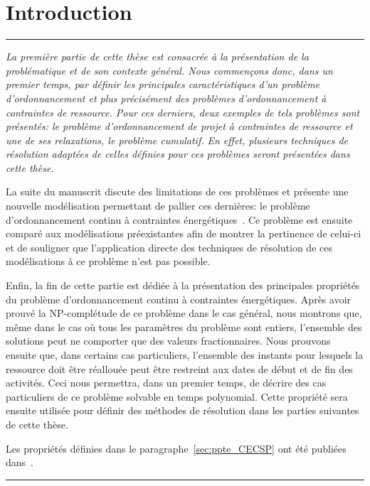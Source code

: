 \cleardoublepage
\begin{minipage}{0.95\linewidth}
  \part{Introduction}
  \vspace{15mm} %
  \parttoc 

\end{minipage}

\newpage
\thispagestyle{empty}
\begin{center}
  \begin{minipage}{\textwidth}
    \hrule
    \vspace{0.5cm}
    {\it  La première partie de cette thèse est consacrée à la présentation de
    la problématique et de son contexte général. Nous commençons donc,
    dans un premier temps, par définir les principales caractéristiques
    d'un problème d'ordonnancement et plus précisément des problèmes
    d'ordonnancement à contraintes de ressource. Pour ces derniers,
    deux exemples de tels problèmes sont présentés: le problème
    d'ordonnancement de projet à contraintes de ressource et une de ses relaxations, le
    problème cumulatif. En effet, plusieurs techniques de résolution
    adaptées de celles définies pour ces problèmes seront présentées
    dans cette thèse. 

    La suite du manuscrit discute des limitations de ces problèmes
    et présente une nouvelle modélisation permettant de pallier ces
    dernières: le problème d'ordonnancement continu à contraintes
    énergétiques~\cite{ArtiguesLopez,Nattaf_ORSpectrum,Nattaf_Constraints}. Ce
    problème est ensuite comparé aux modélisations préexistantes afin de
    montrer la pertinence de celui-ci et de souligner que l'application
    directe des techniques de résolution de ces modélisations à ce
    problème n'est pas possible.

    Enfin, la fin de cette partie est dédiée à la présentation des
    principales propriétés du problème d'ordonnancement continu à
    contraintes énergétiques. Après avoir prouvé la NP-complétude de ce
    problème dans le cas général, nous montrons que, même dans le cas où
    tous les paramètres du problème sont entiers, l'ensemble des solutions
    peut ne comporter que des valeurs fractionnaires. Nous prouvons
    ensuite que, dans certains cas particuliers, l'ensemble des instants
    pour lesquels la ressource doit être réallouée peut être
    restreint aux dates de début et de fin des activités. Ceci nous
    permettra, dans un premier temps, de décrire des cas particuliers
    de ce problème solvable en temps polynomial. Cette propriété sera
    ensuite utilisée pour définir des méthodes de résolution dans les
    parties suivantes de cette thèse. 

    Les propriétés définies dans le paragraphe~\ref{sec:ppte_CECSP}
    ont été publiées
    dans~\cite{Nattaf_ORSpectrum,Nattaf_Constraints,Nattaf_CPDP}.} 
    \vspace{0.5cm}
    \hrule
  \end{minipage}
\end{center}
